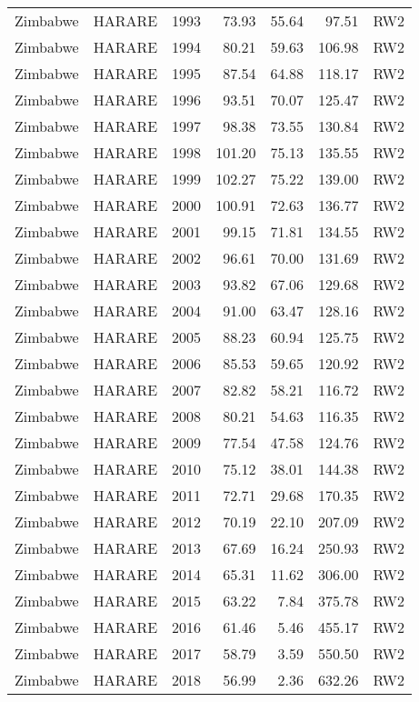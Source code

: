 \begin{longtable}{lllrrrl}
  Zimbabwe & HARARE & 1993 & 73.93 & 55.64 & 97.51 & RW2 \\ 
  Zimbabwe & HARARE & 1994 & 80.21 & 59.63 & 106.98 & RW2 \\ 
  Zimbabwe & HARARE & 1995 & 87.54 & 64.88 & 118.17 & RW2 \\ 
  Zimbabwe & HARARE & 1996 & 93.51 & 70.07 & 125.47 & RW2 \\ 
  Zimbabwe & HARARE & 1997 & 98.38 & 73.55 & 130.84 & RW2 \\ 
  Zimbabwe & HARARE & 1998 & 101.20 & 75.13 & 135.55 & RW2 \\ 
  Zimbabwe & HARARE & 1999 & 102.27 & 75.22 & 139.00 & RW2 \\ 
  Zimbabwe & HARARE & 2000 & 100.91 & 72.63 & 136.77 & RW2 \\ 
  Zimbabwe & HARARE & 2001 & 99.15 & 71.81 & 134.55 & RW2 \\ 
  Zimbabwe & HARARE & 2002 & 96.61 & 70.00 & 131.69 & RW2 \\ 
  Zimbabwe & HARARE & 2003 & 93.82 & 67.06 & 129.68 & RW2 \\ 
  Zimbabwe & HARARE & 2004 & 91.00 & 63.47 & 128.16 & RW2 \\ 
  Zimbabwe & HARARE & 2005 & 88.23 & 60.94 & 125.75 & RW2 \\ 
  Zimbabwe & HARARE & 2006 & 85.53 & 59.65 & 120.92 & RW2 \\ 
  Zimbabwe & HARARE & 2007 & 82.82 & 58.21 & 116.72 & RW2 \\ 
  Zimbabwe & HARARE & 2008 & 80.21 & 54.63 & 116.35 & RW2 \\ 
  Zimbabwe & HARARE & 2009 & 77.54 & 47.58 & 124.76 & RW2 \\ 
  Zimbabwe & HARARE & 2010 & 75.12 & 38.01 & 144.38 & RW2 \\ 
  Zimbabwe & HARARE & 2011 & 72.71 & 29.68 & 170.35 & RW2 \\ 
  Zimbabwe & HARARE & 2012 & 70.19 & 22.10 & 207.09 & RW2 \\ 
  Zimbabwe & HARARE & 2013 & 67.69 & 16.24 & 250.93 & RW2 \\ 
  Zimbabwe & HARARE & 2014 & 65.31 & 11.62 & 306.00 & RW2 \\ 
  Zimbabwe & HARARE & 2015 & 63.22 & 7.84 & 375.78 & RW2 \\ 
  Zimbabwe & HARARE & 2016 & 61.46 & 5.46 & 455.17 & RW2 \\ 
  Zimbabwe & HARARE & 2017 & 58.79 & 3.59 & 550.50 & RW2 \\ 
  Zimbabwe & HARARE & 2018 & 56.99 & 2.36 & 632.26 & RW2 \\ 

\end{longtable}
